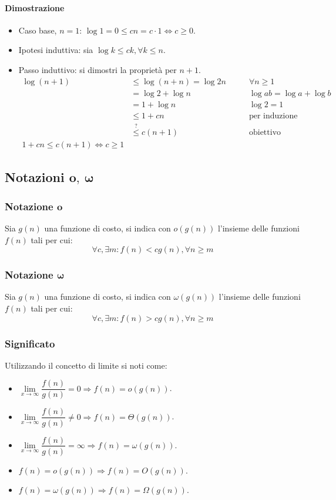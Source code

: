 \paragraph{Dimostrazione}
\begin{itemize}
\item Caso base, $n=1$: $\log 1=0\le cn=c\cdot 1\Leftrightarrow c\ge 0$.
\item Ipotesi induttiva: sia $\log k\le ck, \forall k\le n$.
\item Passo induttivo: si dimostri la propriet\`a per $n+1$.
\begin{align*}
\log(n+1)&\le\log(n+n)=\log 2n\quad\quad &\forall n\ge 1\\
&=\log 2+\log n & \log ab=\log a+\log b\\
&=1+\log n & \log 2=1\\
&\le 1+cn & \text{per induzione}\\
&\overset{?}{\le} c(n+1) & \text{obiettivo}\\
1+cn\le c(n+1)\Leftrightarrow c\ge 1
\end{align*}
\end{itemize}
\subsection{Notazioni $\mathbf{o,\ \omega}$}
\subsubsection{Notazione $\mathbf{o}$}
Sia $g(n)$ una funzione di costo, si indica con $o(g(n))$ l'insieme delle funzioni $f(n)$ tali per cui:
\begin{equation*}
\forall c, \exists m: f(n)<cg(n),\forall n\ge m
\end{equation*}
\subsubsection{Notazione $\mathbf{\omega}$}
Sia $g(n)$ una funzione di costo, si indica con $\omega(g(n))$ l'insieme delle funzioni $f(n)$ tali per cui:
\begin{equation*}
\forall c, \exists m: f(n)>cg(n),\forall n\ge m
\end{equation*}
\subsubsection{Significato}
Utilizzando il concetto di limite si noti come:
\begin{itemize}
\item $\lim\limits_{x\rightarrow\infty}\dfrac{f(n)}{g(n)}=0\Rightarrow f(n)=o(g(n))$.
\item $\lim\limits_{x\rightarrow\infty}\dfrac{f(n)}{g(n)}\neq 0\Rightarrow f(n)=\Theta(g(n))$.
\item $\lim\limits_{x\rightarrow\infty}\dfrac{f(n)}{g(n)}=\infty\Rightarrow f(n)=\omega(g(n))$.
\item $f(n)=o(g(n))\Rightarrow f(n)=O(g(n))$.
\item $f(n)=\omega(g(n))\Rightarrow f(n)=\Omega(g(n))$.
\end{itemize}
